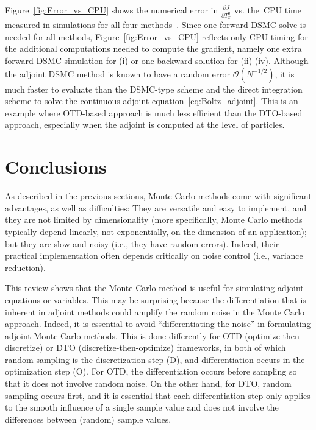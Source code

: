 \documentclass[12pt]{amsart}
\begin{document}
Figure~\ref{fig:Error_vs_CPU} shows the numerical error in $\frac{\partial J}{\partial T_x^0}$ vs.  the~CPU time measured in simulations for all four methods~\cite{caflisch2021adjoint}.  Since one forward DSMC solve is needed for all methods, Figure~\ref{fig:Error_vs_CPU} reflects only CPU timing for the additional computations needed to compute the gradient, namely one extra forward DSMC simulation for (i) or one backward solution for (ii)-(iv).   Although the adjoint DSMC method is known to have a random error $\mathcal{O} (N^{-1/2})$,  it is much faster to evaluate than the DSMC-type scheme and the direct integration scheme to solve the continuous adjoint equation~\eqref{eq:Boltz_adjoint}.  This is an example where OTD-based approach is much less efficient than the DTO-based approach,  especially when the adjoint is computed at the level of particles.





\section{Conclusions}\label{sec:conclusion}
As described in the previous sections, Monte Carlo methods come with significant advantages, as well as difficulties: They are versatile and easy to implement, and they are not limited by dimensionality (more specifically, Monte Carlo methods typically depend linearly, not exponentially, on the dimension of an application); but they are slow and noisy (i.e., they have random errors). Indeed, their practical implementation often depends critically on noise control (i.e., variance reduction).

This review shows that the Monte Carlo method is useful for simulating adjoint equations or variables. This may be surprising because the differentiation that is inherent in adjoint methods could amplify the random noise in the Monte Carlo approach. Indeed, it is essential to avoid “differentiating the noise” in formulating adjoint Monte Carlo methods. This is done differently for OTD (optimize-then-discretize) or DTO (discretize-then-optimize) frameworks, in both of which random sampling is the discretization step (D), and differentiation occurs in the optimization step (O). For OTD, the differentiation occurs before sampling so that it does not involve random noise. On the other hand, for DTO, random sampling occurs first, and it is essential that each differentiation step only applies to the smooth influence of a single sample value and does not involve the differences between (random) sample values. 
\end{document}
